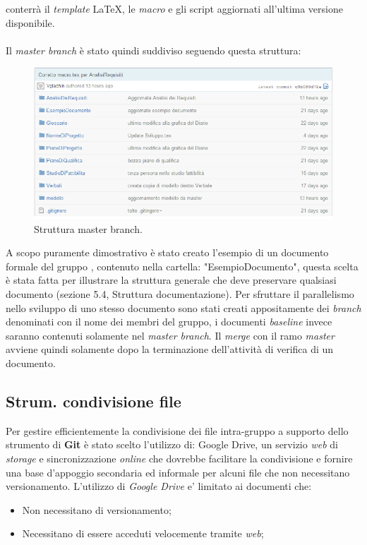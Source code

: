 conterrà il \textit{template} \LaTeX, le \textit{macro} e gli script aggiornati all'ultima versione disponibile.
\\
\\
Il \textit{master branch} è stato quindi suddiviso seguendo questa struttura:
\begin{figure}
\centering
\includegraphics[width= %
\linewidth]{immaginiNDP/repository}
\caption[]{Struttura master branch.}
\label{fig:repository}
\end{figure}
A scopo puramente dimostrativo è stato creato l'esempio di un documento formale del gruppo \gruppo, contenuto nella cartella: "EsempioDocumento", questa scelta è stata fatta per illustrare la struttura generale che deve preservare qualsiasi documento (sezione 5.4, Struttura documentazione).
Per sfruttare il parallelismo nello sviluppo di uno stesso documento sono stati creati appositamente dei  \textit{branch} denominati con il nome dei membri del gruppo, i documenti  \textit{baseline} invece saranno contenuti solamente nel \textit{master branch}. Il \textit{merge} con il ramo \textit{master} avviene quindi solamente dopo la terminazione dell'attività di verifica di un documento.

\subsection{Strum. condivisione file}
Per gestire efficientemente la condivisione dei file intra-gruppo a supporto dello strumento di \textbf{Git} è stato scelto l'utilizzo di: Google Drive, un servizio \textit{web} di \textit{storage} e sincronizzazione \textit{online} che dovrebbe facilitare la condivisione e fornire una base d'appoggio secondaria ed informale per alcuni file che non necessitano versionamento.
L'utilizzo di \textit{Google Drive} e' limitato ai documenti che:
\begin{itemize}
\item Non necessitano di versionamento;
\item Necessitano di essere acceduti velocemente tramite \textit{web};
\end{itemize}
